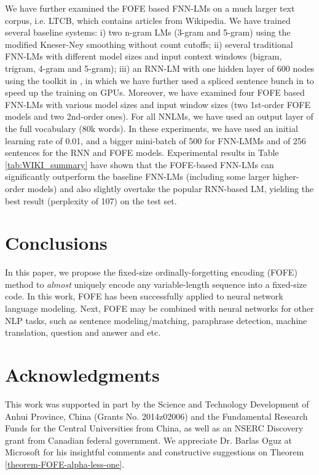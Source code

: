 \documentclass[11pt]{article}
\begin{document}
We have further examined the FOFE based FNN-LMs on a much larger text corpus, i.e. LTCB, which contains articles from Wikipedia. We have trained several  baseline systems: i) two n-gram LMs (3-gram and 5-gram) using the modified Kneser-Ney smoothing without count cutoffs; ii) several traditional FNN-LMs with different model sizes and input context windows (bigram, trigram, 4-gram and 5-gram); iii) an RNN-LM with one hidden layer of 600 nodes using the toolkit in \cite{Mikolov2010recurrent}, in which we have further used a spliced sentence bunch in \cite{Chen2014} to speed up the training on GPUs. Moreover, we have examined four FOFE based FNN-LMs with various model sizes and input window sizes (two 1st-order FOFE models and two 2nd-order ones). For all NNLMs, we have used an output layer of the full vocabulary (80k words). In these experiments, we have used an initial learning rate of 0.01, and a bigger mini-batch of 500 for FNN-LMMs and of 256 sentences for the RNN and FOFE models.
Experimental results in Table \ref{tab:WIKI_summary} have shown that the FOFE-based FNN-LMs can significantly outperform the baseline FNN-LMs (including some larger higher-order models) and also slightly overtake the popular RNN-based LM, yielding the best result (perplexity of 107) on the test set.

\section{Conclusions}
\label{sec.conclusion}

In this paper, we propose the fixed-size ordinally-forgetting encoding (FOFE) method to {\em almost} uniquely encode any variable-length sequence into a fixed-size code. In this work, FOFE has been successfully applied to neural network language modeling. 
Next, FOFE may be combined with neural networks \cite{Zhang2015c,Zhang2015b} for other NLP tasks, such as sentence modeling/matching, paraphrase detection, machine translation, question and answer and etc.

\section*{Acknowledgments}

This work was supported in part by the Science and Technology Development of Anhui Province, China (Grants No. 2014z02006) and the Fundamental Research Funds for the Central Universities from China, as well as an NSERC Discovery grant from Canadian federal government. We appreciate Dr. Barlas Oguz at Microsoft for his insightful comments and constructive suggestions on Theorem \ref{theorem-FOFE-alpha-less-one}.
\end{document}
